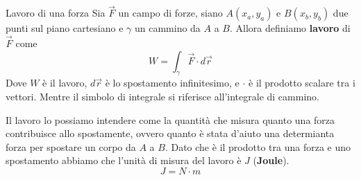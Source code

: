 \documentclass{rapport}
\begin{document}
\begin{definizione}{Lavoro di una forza}{}
  Sia $\vec{F}$ un campo di forze, siano $A(x_a, y_a)$ e $B(x_b, y_b)$ due punti sul piano cartesiano e $\gamma$ un cammino da $A$ a $B$. Allora definiamo \textbf{lavoro} di $\vec{F}$ come 
  \[
  W = \int_{\gamma} \vec{F} \cdot d\vec{r}
  \] 
  Dove $W$ è il lavoro, $d\vec{r}$ è lo spostamento infinitesimo, e $\cdot$ è il prodotto scalare tra i vettori. Mentre il simbolo di integrale si riferisce all'integrale di cammino.
\end{definizione}

Il lavoro lo possiamo intendere come la quantità che misura quanto una forza contribuisce allo spostamente, ovvero quanto è stata d'aiuto una determianta forza per spostare un corpo da $A$ a $B$. Dato che è il prodotto tra una forza e uno spostamento abbiamo che l'unità di misura del lavoro è $J$ (\textbf{Joule}).
\[
J = N \cdot m
\]
\end{document}
